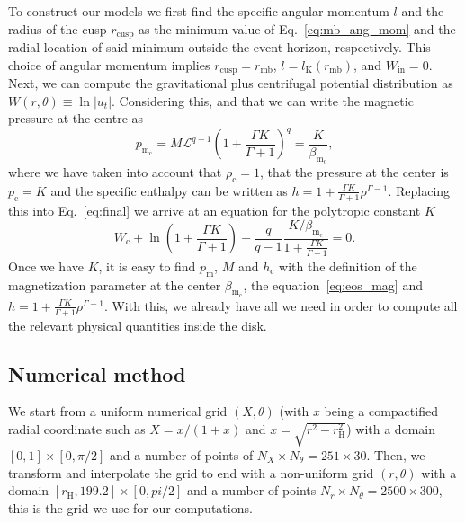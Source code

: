 \documentclass[twocolumn,aps,showpacs,showkeys,prd,superscriptaddress,byrevtex, amsmath]{revtex4-1}
\begin{document}
To construct our models we first find the specific angular momentum $l$ and the radius of the cusp $r_{\mathrm{cusp}}$ as the minimum value of Eq.~\eqref{eq:mb_ang_mom} and the radial location of said minimum outside the event horizon, respectively. This choice of angular momentum implies $r_{\mathrm{cusp}} = r_{\mathrm{mb}}$, $l = l_{\mathrm{K}}(r_{\mathrm{mb}})$, and $W_{\mathrm{in}} = 0$. Next, we can compute the gravitational plus centrifugal potential distribution as $W(r, \theta) \equiv \ln |u_t|$. Considering this, and that we can write the magnetic pressure at the centre as
\begin{equation}
p_{\mathrm{m_c}} = M \mathcal{L}^{q-1} \left(1 + \frac{\Gamma K}{\Gamma +1}\right)^q = \frac{K}{\beta_{\mathrm{m_c}}},
\end{equation}
where we have taken into account that $\rho_{\mathrm{c}} = 1$, that the pressure at the center is $p_{\mathrm{c}} = K$ and the specific enthalpy can be written as $h = 1 + \frac{\Gamma K}{\Gamma +1}\rho^{\Gamma -1}$.  Replacing this into Eq.~\eqref{eq:final} we arrive at an equation for the polytropic constant $K$
\begin{equation}\label{eq:K_eq}
W_{\mathrm{c}} + \ln \left(1 + \frac{\Gamma K}{\Gamma +1}\right) + \frac{q}{q-1}\frac{K/\beta_{\mathrm{m_c}}}{1 + \frac{\Gamma K}{\Gamma +1}} = 0.
\end{equation}
Once we have $K$, it is easy to find $p_{\mathrm{m}}$, $M$ and $h_{\mathrm{c}}$ with the definition of the magnetization parameter at the center $\beta_{\mathrm{m_c}}$, the equation~\eqref{eq:eos_mag} and $h = 1 + \frac{\Gamma K}{\Gamma +1}\rho^{\Gamma -1}$. With this, we already have all we need in order to compute all the relevant physical quantities inside the disk.

\subsection{Numerical method}

We start from a uniform numerical grid $(X, \theta)$ (with $x$ being a compactified radial coordinate such as $X = x/(1+x)$ and $x = \sqrt{r^2 - r_{\mathrm{H}}^2}$) with a domain $[0, 1] \times [0, \pi/2]$ and a number of points of $N_X \times N_\theta = 251 \times 30$. Then, we transform and interpolate the grid to end with a non-uniform grid $(r, \theta)$ with a domain $[r_{\mathrm{H}}, 199.2] \times [0, pi/2]$ and a number of points $N_r \times N_\theta = 2500 \times 300$, this is the grid we use for our computations.
\end{document}
